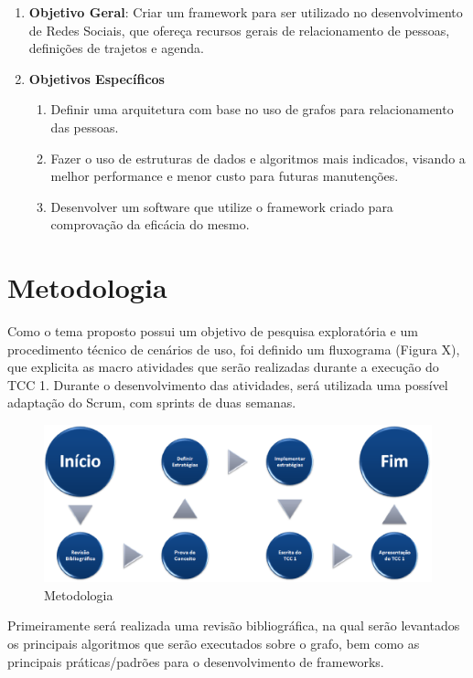 \begin{enumerate}
	\item \textbf{Objetivo Geral}: Criar um framework para ser utilizado no desenvolvimento de Redes Sociais, que ofereça recursos gerais de relacionamento de pessoas, definições de trajetos e agenda.

	\item \textbf{Objetivos Específicos}
	\begin{enumerate}
		\item Definir uma arquitetura com base no uso de grafos para relacionamento das pessoas.
		\item Fazer o uso de estruturas de dados e algoritmos mais indicados, visando a melhor performance e menor custo para futuras manutenções.
		\item Desenvolver um software que utilize o framework criado para comprovação da eficácia do mesmo.
	\end{enumerate}
\end{enumerate}

\section*{Metodologia}

Como o tema proposto possui um objetivo de pesquisa exploratória e um procedimento técnico de cenários de uso, foi definido um fluxograma (Figura X), que explicita as macro atividades que serão realizadas durante a execução do TCC 1.  Durante o desenvolvimento das atividades, será utilizada uma possível adaptação do Scrum, com sprints de duas semanas.

\begin{figure}[!h]
	\centering
	\includegraphics[scale=0.5]{figuras/metodologia.eps}
	\caption{Metodologia}
	\label{Metodologia}
\end{figure}

Primeiramente será realizada uma revisão bibliográfica, na qual serão levantados os principais algoritmos que serão executados sobre o grafo, bem como as principais práticas/padrões para o desenvolvimento de frameworks.

